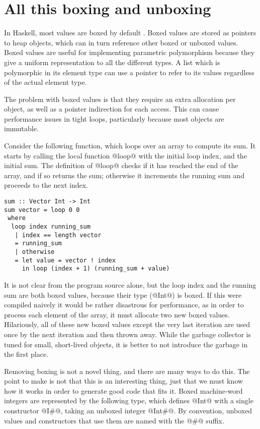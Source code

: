 \section{All this boxing and unboxing}
In Haskell, most values are boxed by default \citep{jones1991unboxed}.
Boxed values are stored as pointers to heap objects, which can in turn reference other boxed or unboxed values.
Boxed values are useful for implementing parametric polymorphism because they give a uniform representation to all the different types.
A list which is polymorphic in its element type can use a pointer to refer to its values regardless of the actual element type.

The problem with boxed values is that they require an extra allocation per object, as well as a pointer indirection for each access.
This can cause performance issues in tight loops, particularly because most objects are immutable.

Consider the following function, which loops over an array to compute its sum.
It starts by calling the local function @loop@ with the initial loop index, and the initial sum.
The definition of @loop@ checks if it has reached the end of the array, and if so returns the sum; otherwise it increments the running sum and proceeds to the next index.

\begin{lstlisting}
sum :: Vector Int -> Int
sum vector = loop 0 0
 where
  loop index running_sum
   | index == length vector
   = running_sum
   | otherwise
   = let value = vector ! index
     in loop (index + 1) (running_sum + value)
\end{lstlisting}

It is not clear from the program source alone, but the loop index and the running sum are both boxed values, because their type (@Int@) is boxed.
If this were compiled naively it would be rather disastrous for performance, as in order to process each element of the array, it must allocate two new boxed values.
Hilariously, all of these new boxed values except the very last iteration are used once by the next iteration and then thrown away.
While the garbage collector is tuned for small, short-lived objects, it is better to not introduce the garbage in the first place.

Removing boxing is not a novel thing, and there are many ways to do this.
The point to make is not that this is an interesting thing, just that we must know how it works in order to generate good code that fits it.
Boxed machine-word integers are represented by the following type, which defines @Int@ with a single constructor @I#@, taking an unboxed integer @Int#@. By convention, unboxed values and constructors that use them are named with the @#@ suffix.

